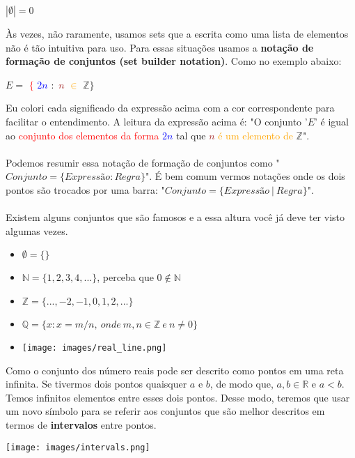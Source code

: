 \documentclass[a4paper,11pt]{book}
\theoremstyle{definition}
\begin{document}
\begin{center}
	$|\emptyset| = 0$
\end{center}

Às vezes, não raramente, usamos sets que a escrita como uma lista de elementos não é tão intuitiva para uso. Para essas situações usamos a \textbf{notação de formação de conjuntos (set builder notation)}. Como no exemplo abaixo:

\begin{center}
	$ E = $ \textcolor{red}{$\{$} \textcolor{blue}{$2n$} \textcolor{OliveGreen}{$:$} \textcolor{Brown}{$n$} \textcolor{Orange}{$\in$} $\mathbb{Z} \}$
\end{center}

Eu colori cada significado da expressão acima com a cor correspondente para facilitar o entendimento. A leitura da expressão acima é: "O conjunto '$E$' é igual ao \textcolor{red}{conjunto dos elementos da forma} \textcolor{blue}{$2n$} \textcolor{OliveGreen}{tal que} \textcolor{Brown}{$n$} \textcolor{Orange}{é um elemento de} $\mathbb{Z}$".
\\
\\
Podemos resumir essa notação de formação de conjuntos como "$Conjunto = \{ Expressão : Regra \}$". É bem comum vermos notações onde os dois pontos são trocados por uma barra: "$Conjunto = \{ Expressão \ | \ Regra \}$".
\\
\\
Existem alguns conjuntos que são famosos e a essa altura você já deve ter visto algumas vezes.
\begin{itemize}
	\item[] $\emptyset = \{ \}$
	\item[] $\mathbb{N} = \{ 1, 2, 3, 4, ... \}$, perceba que $0 \notin \mathbb{N}$
	\item[] $\mathbb{Z} = \{ ..., -2, -1, 0, 1, 2, ...  \}$
	\item[] $\mathbb{Q} = \{ x : x = m/n, \ onde \ m,n \in \mathbb{Z} \  e \  n \neq 0 \}$
	\item[] \texttt{[image: images/real\_line.png]}
\end{itemize}

Como o conjunto dos número reais pode ser descrito como pontos em uma reta infinita. Se tivermos dois pontos quaisquer $a$ e $b$, de modo que, $a,b \in \mathbb{R}$ e $a < b$. Temos infinitos elementos entre esses dois pontos. Desse modo, teremos que usar um novo símbolo para se referir aos conjuntos que são melhor descritos em termos de \textbf{intervalos} entre pontos.
\begin{center}
	\texttt{[image: images/intervals.png]}
\end{center}
\end{document}
